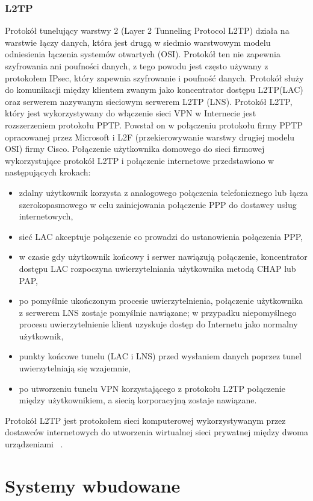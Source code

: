 \documentclass[12p]{article}
\begin{document}
\subsubsection{L2TP}
\quad Protokół tunelujący warstwy 2 (Layer 2 Tunneling Protocol L2TP) działa na warstwie łączy danych, która jest drugą w siedmio warstwowym modelu odniesienia łączenia systemów otwartych (OSI). Protokół ten nie zapewnia szyfrowania ani poufności danych, z tego powodu jest często używany z protokołem IPsec, który zapewnia szyfrowanie i poufność danych. Protokół służy do komunikacji między klientem zwanym jako koncentrator dostępu L2TP(LAC) oraz serwerem nazywanym sieciowym serwerem L2TP (LNS). 
Protokół L2TP, który jest wykorzystywany do włączenie sieci VPN w Internecie jest rozszerzeniem protokołu PPTP. Powstał on w połączeniu protokołu firmy PPTP opracowanej przez Microsoft i L2F (przekierowywanie warstwy drugiej modelu OSI) firmy Cisco. Połączenie użytkownika domowego do sieci firmowej wykorzystujące protokół L2TP i połączenie internetowe przedstawiono w następujących krokach:
\begin{itemize}
\item zdalny użytkownik korzysta z analogowego połączenia telefonicznego lub łącza szerokopasmowego w celu zainicjowania połączenie PPP do dostawcy usług internetowych,
\item sieć LAC akceptuje połączenie co prowadzi do ustanowienia połączenia PPP,
\item w czasie gdy użytkownik końcowy i serwer nawiązują połączenie, koncentrator dostępu LAC rozpoczyna uwierzytelniania użytkownika metodą CHAP lub PAP,
\item po pomyślnie ukończonym procesie uwierzytelnienia, połączenie użytkownika z serwerem LNS zostaje pomyślnie nawiązane; w przypadku niepomyślnego procesu uwierzytelnienie klient uzyskuje dostęp do Internetu jako normalny użytkownik,
\item punkty końcowe tunelu (LAC i LNS) przed wysłaniem danych poprzez tunel uwierzytelniają się wzajemnie,
\item po utworzeniu tunelu VPN korzystającego z protokołu L2TP połączenie między użytkownikiem, a siecią korporacyjną zostaje nawiązane. 
\end{itemize}
Protokół L2TP jest protokołem sieci komputerowej wykorzystywanym przez dostawców internetowych do utworzenia wirtualnej sieci prywatnej między dwoma urządzeniami ~\cite{L2TP}.

\newpage
\section{Systemy wbudowane}
\end{document}
